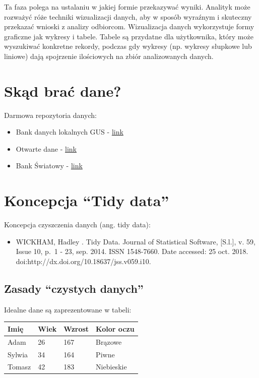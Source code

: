 \documentclass[
  letterpaper,
  DIV=11,
  numbers=noendperiod]{scrreprt}
\providecommand{\tightlist}{%
  \setlength{\itemsep}{0pt}\setlength{\parskip}{0pt}}\usepackage{longtable,booktabs,array}
\begin{document}
Ta faza polega na ustalaniu w jakiej formie przekazywać wyniki. Analityk
może rozważyć róże techniki wizualizacji danych, aby w sposób wyraźnym i
skuteczny przekazać wnioski z analizy odbiorcom. Wizualizacja danych
wykorzystuje formy graficzne jak wykresy i tabele. Tabele są przydatne
dla użytkownika, który może wyszukiwać konkretne rekordy, podczas gdy
wykresy (np. wykresy słupkowe lub liniowe) dają spojrzenie ilościowych
na zbiór analizowanych danych.

\section{Skąd brać dane?}\label{skux105d-braux107-dane}

Darmowa repozytoria danych:

\begin{itemize}
\tightlist
\item
  Bank danych lokalnych GUS -
  \href{https://bdl.stat.gov.pl/BDL/start}{link}
\item
  Otwarte dane - \href{https://dane.gov.pl/}{link}
\item
  Bank Światowy - \href{https://data.worldbank.org/}{link}
\end{itemize}

\section{Koncepcja ``Tidy data''}\label{koncepcja-tidy-data}

Koncepcja czyszczenia danych (ang. tidy data):

\begin{itemize}
\tightlist
\item
  WICKHAM, Hadley . Tidy Data. Journal of Statistical Software,
  {[}S.l.{]}, v. 59, Issue 10, p.~1 - 23, sep. 2014. ISSN 1548-7660.
  Date accessed: 25 oct. 2018.
  doi:http://dx.doi.org/10.18637/jss.v059.i10.
\end{itemize}

\subsection{Zasady ``czystych danych''}\label{zasady-czystych-danych}

Idealne dane są zaprezentowane w tabeli:

\begin{longtable}[]{@{}llll@{}}
\toprule\noalign{}
Imię & Wiek & Wzrost & Kolor oczu \\
\midrule\noalign{}
\endhead
\bottomrule\noalign{}
\endlastfoot
Adam & 26 & 167 & Brązowe \\
Sylwia & 34 & 164 & Piwne \\
Tomasz & 42 & 183 & Niebieskie \\
\end{longtable}
\end{document}
